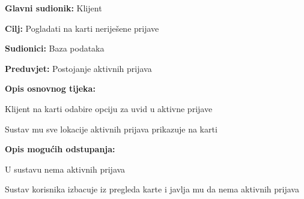 					\noindent {}
					\begin{packed_item}
	
						\item \textbf{Glavni sudionik: }Klijent
						\item  \textbf{Cilj:} Pogladati na karti neriješene prijave
						\item  \textbf{Sudionici:} Baza podataka
						\item  \textbf{Preduvjet:} Postojanje aktivnih prijava
						\item  \textbf{Opis osnovnog tijeka:}
						
						\item[] \begin{packed_enum}
	
							\item Klijent na karti odabire opciju za uvid u aktivne prijave 
							\item Sustav mu sve lokacije aktivnih prijava prikazuje na karti
						\end{packed_enum}
						
						\item  \textbf{Opis mogućih odstupanja:}
						
						\item[] \begin{packed_item}
	
							\item[1.a] U sustavu nema aktivnih prijava
							\item[] \begin{packed_enum}
								
								\item Sustav korisnika izbacuje iz pregleda karte i javlja mu da nema aktivnih prijava	
							\end{packed_enum}
							
						\end{packed_item}
					\end{packed_item}
					
